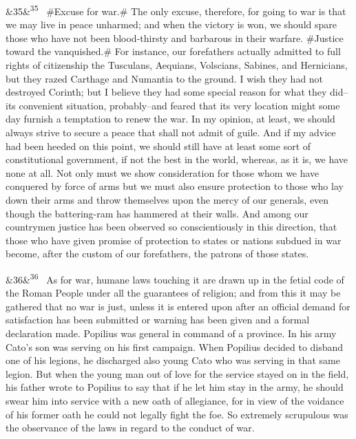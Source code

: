 \documentclass[12pt]{article}
\newcommand{\para}[1][]{\par\noindent\ifx&#1&\else\textsuperscript{\footnotesize #1}~\fi}
\begin{document}
\para[35] \#Excuse for war.\# The only excuse, therefore, for going to war is that we may live in peace unharmed; and when the victory is won, we should spare those who have not been blood-thirsty and barbarous in their warfare. \#Justice toward the vanquished.\# For instance, our forefathers actually admitted to full rights of citizenship the Tusculans, Aequians, Volscians, Sabines, and Hernicians, but they razed Carthage and Numantia to the ground. I wish they had not destroyed Corinth; but I believe they had some special reason for what they did--its convenient situation, probably--and feared that its very location might some day furnish a temptation to renew the war. In my opinion, at least, we should always strive to secure a peace that shall not admit of guile. And if my advice had been heeded on this point, we should still have at least some sort of constitutional government, if not the best in the world, whereas, as it is, we have none at all. Not only must we show consideration for those whom we have conquered by force of arms but we must also ensure protection to those who lay down their arms and throw themselves upon the mercy of our generals, even though the battering-ram has hammered at their walls. And among our countrymen justice has been observed so conscientiously in this direction, that those who have given promise of protection to states or nations subdued in war become, after the custom of our forefathers, the patrons of those states.

\para[36] As for war, humane laws touching it are drawn up in the fetial code of the Roman People under all the guarantees of religion; and from this it may be gathered that no war is just, unless it is entered upon after an official demand for satisfaction has been submitted or warning has been given and a formal declaration made. Popilius was general in command of a province. In his army Cato's son was serving on his first campaign. When Popilius decided to disband one of his legions, he discharged also young Cato who was serving in that same legion. But when the young man out of love for the service stayed on in the field, his father wrote to Popilius to say that if he let him stay in the army, he should swear him into service with a new oath of allegiance, for in view of the voidance of his former oath he could not legally fight the foe. So extremely scrupulous was the observance of the laws in regard to the conduct of war.
\end{document}
